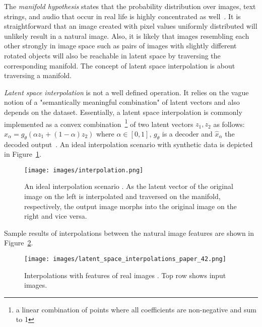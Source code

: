 \documentclass[12pt,a4paper]{article}
\begin{document}
The \textit{manifold hypothesis} states that the probability distribution over images, text strings, and audio that occur in real life is highly concentrated as well~\cite{ReprLearning}. It is straightforward that an image created with pixel values uniformly distributed will unlikely result in a natural image. Also, it is likely that images resembling each other strongly in image space such as pairs of images with slightly different rotated objects will also be reachable in latent space by traversing the corresponding manifold. The concept of latent space interpolation is about traversing a manifold.

\textit{Latent space interpolation} is not a well defined operation. It relies on the vague notion of a "semantically meaningful combination" of latent vectors and also depends on the dataset. Essentially, a latent space interpolation is commonly implemented as a convex combination~\footnote{a linear combination of points where all coefficients are non-negative and sum to 1} of two latent vectors $z_1, z_2$ as follows: $\hat{x}_{\alpha} = g_{\theta}(\alpha z_1+(1-\alpha)z_2)$ where $\alpha \in [0,1]$, $g_{\theta}$ is a decoder and $\hat{x}_{\alpha}$ the decoded output~\cite{AE_Interp}. An ideal interpolation scenario with synthetic data is depicted in Figure~\ref{fig:interpolation_ideal}.
\begin{figure}[ht]
\centering
\texttt{[image: images/interpolation.png]}
\caption{An ideal interpolation scenario \cite{InkscapeInterpolation}. As the latent vector of the original image on the left is interpolated and traversed on the manifold, respectively, the output image morphs into the original image on the right and vice versa.}
\label{fig:interpolation_ideal}
\end{figure}

Sample results of interpolations between the natural image features are shown in Figure~\ref{fig:interpolation_real}.
\begin{figure}[ht]
\centering
\texttt{[image: images/latent\_space\_interpolations\_paper\_42.png]}
\caption{Interpolations with features of real images \cite{InterpolExamples}. Top row shows input images.}
\label{fig:interpolation_real}
\end{figure}


\end{document}
